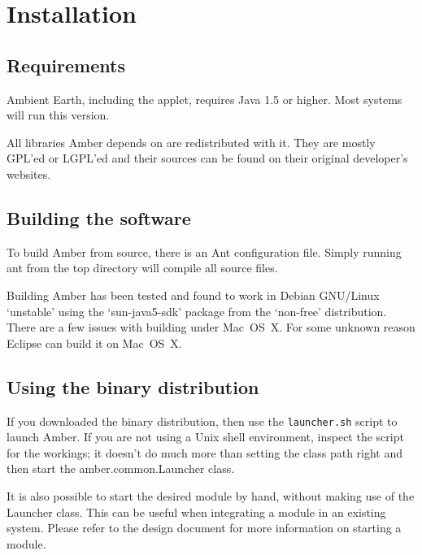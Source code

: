 \chapter{\label{cpt:usage:installation}Installation}

\section{Requirements}

Ambient Earth, including the applet, requires Java 1.5 or higher. Most systems
will run this version.

All libraries Amber depends on are redistributed with it. They are mostly
GPL'ed or LGPL'ed and their sources can be found on their original developer's
websites.

\section{Building the software}

To build Amber from source, there is an Ant configuration file. Simply running
ant from the top directory will compile all source files.

Building Amber has been tested and found to work in Debian GNU/Linux `unstable'
using the `sun-java5-sdk' package from the `non-free' distribution. There are a
few issues with building under Mac~OS~X. For some unknown reason Eclipse can
build it on Mac~OS~X.

\section{Using the binary distribution}

If you downloaded the binary distribution, then use the \texttt{launcher.sh}
script to launch Amber. If you are not using a Unix shell environment, inspect
the script for the workings; it doesn't do much more than setting the class
path right and then start the amber.common.Launcher class.

It is also possible to start the desired module by hand, without making use of
the Launcher class. This can be useful when integrating a module in an existing
system. Please refer to the design document for more information on starting a
module.
